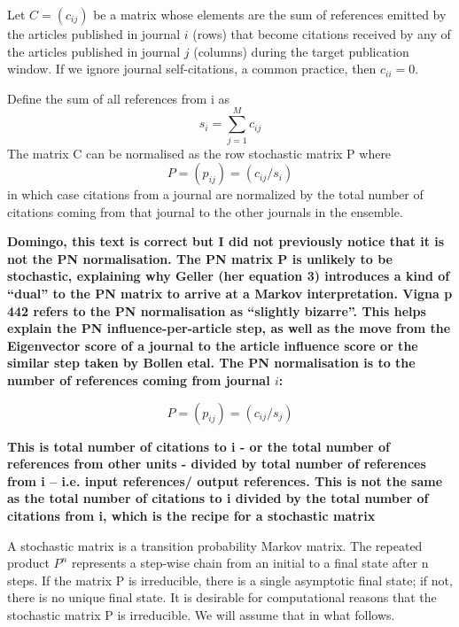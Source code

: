 \documentclass[10pt]{article}
\begin{document}
Let $C = (c_{ij})$ be a matrix whose elements are the sum of references emitted by
the articles published in journal $i$ (rows) that become citations received by any of the articles published in journal $j$ (columns) during the target
publication window. If we ignore journal self-citations, a common practice, then $c_{ii} = 0$.


\noindent Define the sum of all references from i as
\begin{equation}
s_i = \sum_{j=1}^Mc_{ij}
\end{equation}
The matrix C can be normalised as the row stochastic matrix P where
\begin{equation}
P = (p_{ij}) = (c_{ij}/s_i)
\end{equation}
in which case citations from a journal are normalized by the total number of citations coming from that journal to the other journals in the ensemble.

\textbf{Domingo, this text is correct but I did not previously notice that it is not the PN normalisation. The PN matrix P is unlikely to be stochastic, explaining why Geller (her equation 3) introduces a kind of ``dual'' to the PN matrix to arrive at a Markov interpretation. Vigna p 442 refers to the PN normalisation as ``slightly bizarre''. This helps explain the PN influence-per-article step, as well as the move from the Eigenvector score of a journal to the article influence score or the similar step taken by Bollen etal.  The PN normalisation is to the number of references coming from journal $i$:}

\begin{equation}
P = (p_{ij}) = (c_{ij}/s_j)
\end{equation}

\textbf{This is total number of citations to i - or the total number of references from other units -  divided by total number of references from i -- i.e. input references/ output references. This is not the same as the total number of citations to i divided by the total number of citations from i, which is the recipe for a stochastic matrix}

A stochastic matrix is a transition probability Markov matrix. The repeated product $P^n$ represents a step-wise chain from an initial to a final state
after n steps. If the matrix P is irreducible, there is a single asymptotic final state; if
not, there is no unique final state. It is desirable for computational reasons that the stochastic matrix P  is irreducible. We will assume that in what follows.
\end{document}
